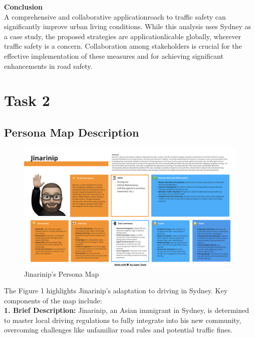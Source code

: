 \documentclass[12pt,a4paper]{article}
\begin{document}
\noindent\textbf{Conclusion}\\
\noindent A comprehensive and collaborative applicationroach to traffic safety can significantly improve urban living conditions. While this analysis uses Sydney as a case study, the proposed strategies are applicationlicable globally, wherever traffic safety is a concern. Collaboration among stakeholders is crucial for the effective implementation of these measures and for achieving significant enhancements in road safety.

\pagebreak %

\setcounter{page}{2}
\label{sec:Question 2}
\section{Task 2}

\subsection{Persona Map Description}

\begin{figure}[htbp]
    \centering
    \includegraphics[width=1.0\textwidth]{images/PersonaMap.png}
    \caption{Jinarinip's Persona Map}
    \label{fig:example}
\end{figure}

\noindent The Figure 1 highlights Jinarinip's adaptation to driving in Sydney. Key components of the map include:\\

\noindent\textbf{1. Brief Description:} Jinarinip, an Asian immigrant in Sydney, is determined to master local driving regulations to fully integrate into his new community, overcoming challenges like unfamiliar road rules and potential traffic fines.\\
\end{document}

